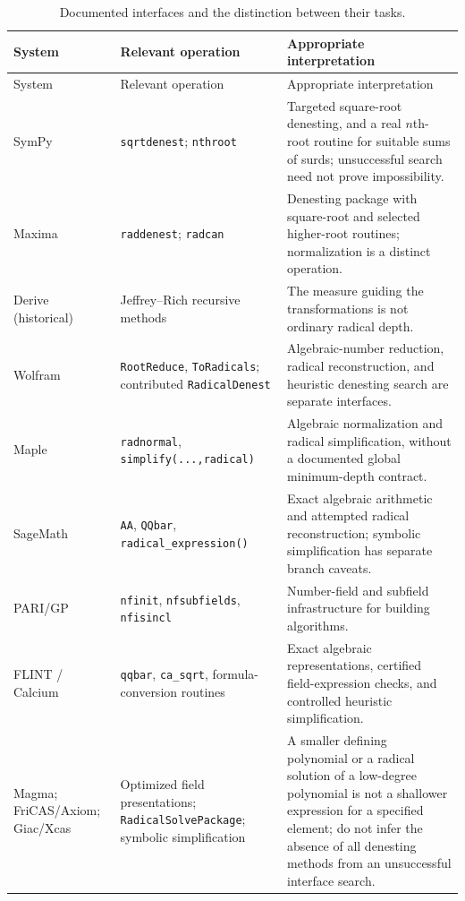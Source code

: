 \documentclass[11pt,oneside]{article}
\numberwithin{equation}{section}
\theoremstyle{definition}
\theoremstyle{remark}
\begin{document}
\begin{longtable}{@{}p{}p{}p{}@{}}
\caption{Documented interfaces and the distinction between their tasks.}\label{tab:cas}\\
\toprule
System & Relevant operation & Appropriate interpretation\\
\midrule
\endfirsthead
\toprule System & Relevant operation & Appropriate interpretation\\\midrule
\endhead
\bottomrule\endfoot
SymPy & \texttt{sqrtdenest}; \texttt{nthroot} & Targeted square-root denesting, and a real $n$th-root routine for suitable sums of surds; unsuccessful search need not prove impossibility.\\[5pt]
Maxima & \texttt{raddenest}; \texttt{radcan} & Denesting package with square-root and selected higher-root routines; normalization is a distinct operation.\\[5pt]
Derive (historical) & Jeffrey--Rich recursive methods & The measure guiding the transformations is not ordinary radical depth.\\[5pt]
Wolfram & \texttt{RootReduce}, \texttt{ToRadicals}; contributed \texttt{RadicalDenest} & Algebraic-number reduction, radical reconstruction, and heuristic denesting search are separate interfaces.\\[5pt]
Maple & \texttt{radnormal}, \texttt{simplify(...,radical)} & Algebraic normalization and radical simplification, without a documented global minimum-depth contract.\\[5pt]
SageMath & \texttt{AA}, \texttt{QQbar}, \texttt{radical\_expression()} & Exact algebraic arithmetic and attempted radical reconstruction; symbolic simplification has separate branch caveats.\\[5pt]
PARI/GP & \texttt{nfinit}, \texttt{nfsubfields}, \texttt{nfisincl} & Number-field and subfield infrastructure for building algorithms.\\[5pt]
FLINT / Calcium & \texttt{qqbar}, \texttt{ca\_sqrt}, formula-conversion routines & Exact algebraic representations, certified field-expression checks, and controlled heuristic simplification.\\[5pt]
Magma; FriCAS/Axiom; Giac/Xcas & Optimized field presentations; \texttt{RadicalSolvePackage}; symbolic simplification & A smaller defining polynomial or a radical solution of a low-degree polynomial is not a shallower expression for a specified element; do not infer the absence of all denesting methods from an unsuccessful interface search.\\
\end{longtable}
\end{document}
